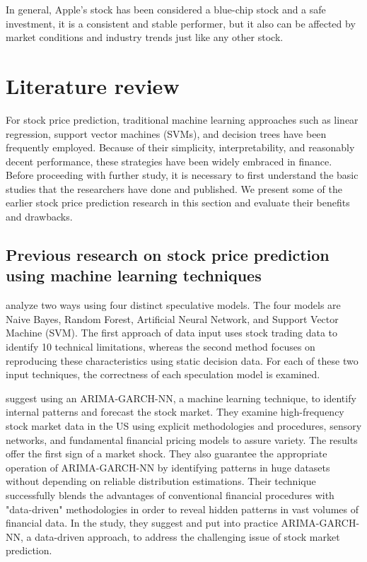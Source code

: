 \documentclass[a4paper]{article}
\begin{document}
In general, Apple's stock has been considered a blue-chip stock and a safe investment, it is a consistent and stable performer, but it also can be affected by market conditions and industry trends just like any other stock.

\section{Literature review}
For stock price prediction, traditional machine learning approaches such as linear regression, support vector machines (SVMs), and decision trees have been frequently employed. Because of their simplicity, interpretability, and reasonably decent performance, these strategies have been widely embraced in finance. Before proceeding with further study, it is necessary to first understand the basic studies that the researchers have done and published. We present some of the earlier stock price prediction research in this section and evaluate their benefits and drawbacks.
\subsection{Previous research on stock price prediction using machine learning techniques}

\textbf{\cite{patel2015predicting}} analyze two ways using four distinct speculative models. The four models are Naive Bayes, Random Forest, Artificial Neural Network, and  Support Vector Machine (SVM). The first approach of data input uses stock trading data to identify 10 technical limitations, whereas the second method focuses on reproducing these characteristics using static decision data. For each of these two input techniques, the correctness of each speculation model is examined.

\textbf{\cite{sun2019exploiting}} suggest using an ARIMA-GARCH-NN, a machine learning technique, to identify internal patterns and forecast the stock market. They examine high-frequency stock market data in the US using explicit methodologies and procedures, sensory networks, and fundamental financial pricing models to assure variety. The results offer the first sign of a market shock. They also guarantee the appropriate operation of ARIMA-GARCH-NN by identifying patterns in huge datasets without depending on reliable distribution estimations. Their technique successfully blends the advantages of conventional financial procedures with "data-driven" methodologies in order to reveal hidden patterns in vast volumes of financial data. In the study, they suggest and put into practice ARIMA-GARCH-NN, a data-driven approach, to address the challenging issue of stock market prediction.
\end{document}
